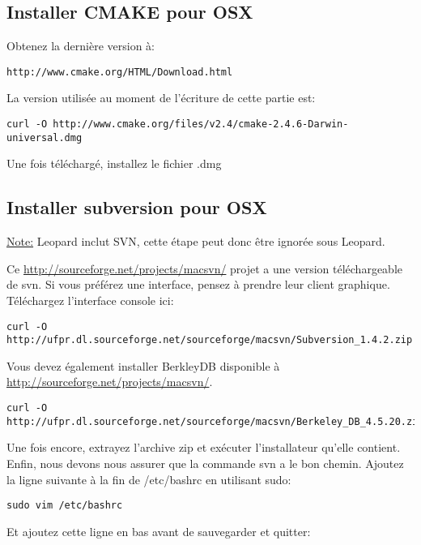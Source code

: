 \subsection{Installer CMAKE pour OSX}
Obtenez la dernière version à:

\begin{verbatim}
http://www.cmake.org/HTML/Download.html 
\end{verbatim}

La version utilisée au moment de l'écriture de cette partie est:

\begin{verbatim}
curl -O http://www.cmake.org/files/v2.4/cmake-2.4.6-Darwin-universal.dmg
\end{verbatim}

Une fois téléchargé, installez le fichier .dmg

\subsection{Installer subversion pour OSX}
\underline{Note:} Leopard inclut SVN, cette étape peut donc être ignorée sous Leopard.

Ce \url{http://sourceforge.net/projects/macsvn/} projet a une version téléchargeable de svn. Si vous préférez une interface, pensez à prendre leur client graphique. Téléchargez l'interface console ici:

\begin{verbatim}
curl -O http://ufpr.dl.sourceforge.net/sourceforge/macsvn/Subversion_1.4.2.zip 
\end{verbatim}

Vous devez également installer BerkleyDB disponible à \url{http://sourceforge.net/projects/macsvn/}. 

\begin{verbatim}
curl -O
http://ufpr.dl.sourceforge.net/sourceforge/macsvn/Berkeley_DB_4.5.20.zip 
\end{verbatim}

Une fois encore, extrayez l'archive zip et exécuter l'installateur qu'elle contient. Enfin, nous devons nous assurer que la commande svn a le bon chemin. Ajoutez la ligne suivante à la fin de /etc/bashrc en utilisant sudo:

\begin{verbatim}
sudo vim /etc/bashrc 
\end{verbatim}

Et ajoutez cette ligne en bas avant de sauvegarder et quitter:

